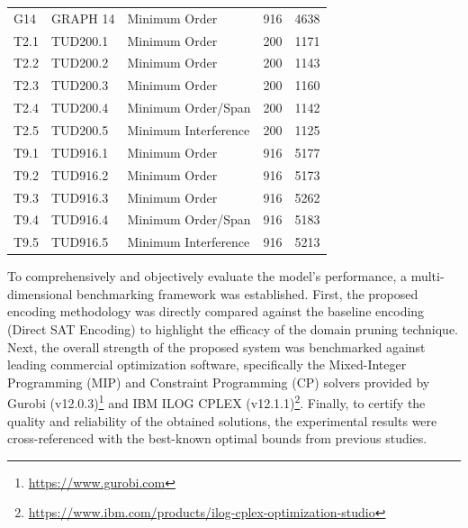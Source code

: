 \documentclass[letterpaper,journal]{IEEEtran}
\begin{document}
\begin{table}[htbp]
\begin{tabular}{l l l r r}
G14 & GRAPH 14 & Minimum Order        & 916 & 4638 \\
T2.1 & TUD200.1 & Minimum Order        & 200 & 1171 \\
T2.2 & TUD200.2 & Minimum Order        & 200 & 1143 \\
T2.3 & TUD200.3 & Minimum Order        & 200 & 1160 \\
T2.4 & TUD200.4 & Minimum Order/Span   & 200 & 1142 \\
T2.5 & TUD200.5 & Minimum Interference & 200 & 1125 \\
T9.1 & TUD916.1 & Minimum Order        & 916 & 5177 \\
T9.2 & TUD916.2 & Minimum Order        & 916 & 5173 \\
T9.3 & TUD916.3 & Minimum Order        & 916 & 5262 \\
T9.4 & TUD916.4 & Minimum Order/Span   & 916 & 5183 \\
T9.5 & TUD916.5 & Minimum Interference & 916 & 5213 \\
\bottomrule
\end{tabular}
\end{table}
To comprehensively and objectively evaluate the model's performance, a multi-dimensional benchmarking framework was established. First, the proposed encoding methodology was directly compared against the baseline encoding (Direct SAT Encoding) to highlight the efficacy of the domain pruning technique. Next, the overall strength of the proposed system was benchmarked against leading commercial optimization software, specifically the Mixed-Integer Programming (MIP) and Constraint Programming (CP) solvers provided by Gurobi (v12.0.3)\footnote{\url{https://www.gurobi.com}} and IBM ILOG CPLEX (v12.1.1)\footnote{\url{https://www.ibm.com/products/ilog-cplex-optimization-studio}}. Finally, to certify the quality and reliability of the obtained solutions, the experimental results were cross-referenced with the best-known optimal bounds from previous studies.

\end{document}
